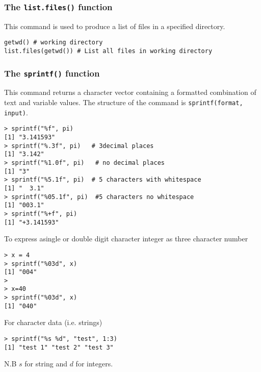 \documentclass[12pt]{article}
\begin{document}
\subsubsection{The \texttt{list.files()} function}
This command is used to produce a list of files in a specified directory.
\begin{framed}
\begin{verbatim}
getwd() # working directory
list.files(getwd()) # List all files in working directory
\end{verbatim}
\end{framed}
\subsubsection{The \texttt{sprintf()} function}
This command returns a character vector containing a formatted combination of text and variable values. The structure of the command is \texttt{sprintf(format, input)}.
\begin{verbatim}
> sprintf("%f", pi)     
[1] "3.141593"
> sprintf("%.3f", pi)   # 3decimal places
[1] "3.142"
> sprintf("%1.0f", pi)   # no decimal places
[1] "3"
> sprintf("%5.1f", pi)  # 5 characters with whitespace
[1] "  3.1"  
> sprintf("%05.1f", pi)  #5 characters no whitespace
[1] "003.1"
> sprintf("%+f", pi)
[1] "+3.141593"
\end{verbatim}

To express asingle or double digit character integer as three character number
\begin{verbatim}
> x = 4
> sprintf("%03d", x)
[1] "004"
> 
> x=40
> sprintf("%03d", x)
[1] "040"
\end{verbatim}

For character data (i.e. strings) 
\begin{verbatim}
> sprintf("%s %d", "test", 1:3)
[1] "test 1" "test 2" "test 3"
\end{verbatim}
N.B $s$ for string and $d$ for integers.
\newpage
\end{document}
